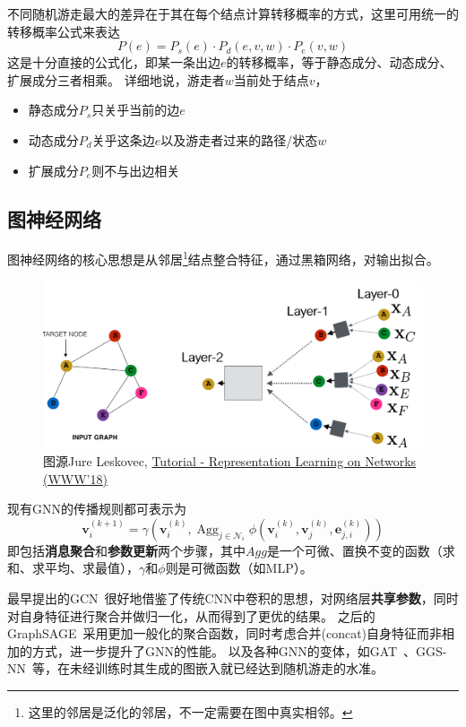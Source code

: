 \documentclass[reportComp]{thesis}
\begin{document}
不同随机游走最大的差异在于其在每个结点计算转移概率的方式\cite{yang:knightking_sosp_2019}，这里可用统一的转移概率公式来表达%
\[P(e)=P_s(e)\cdot P_d(e,v,w)\cdot P_e(v,w)\]
这是十分直接的公式化，即某一条出边$e$的转移概率，等于静态成分、动态成分、扩展成分三者相乘。
详细地说，游走者$w$当前处于结点$v$，
\begin{itemize}
	\item 静态成分$P_s$只关乎当前的边$e$
	\item 动态成分$P_d$关乎这条边$e$以及游走者过来的路径/状态$w$%
	\item 扩展成分$P_e$则不与出边相关%
\end{itemize}

\subsection{图神经网络}
图神经网络的核心思想是从邻居\footnote{这里的邻居是泛化的邻居，不一定需要在图中真实相邻。}结点整合特征，通过黑箱网络，对输出拟合。
\begin{figure}[H]
\centering
\includegraphics[width=0.8\linewidth]{fig/grl-layers.png}
\caption{图源Jure Leskovec, \href{http://snap.stanford.edu/proj/embeddings-www/}{Tutorial - Representation Learning on Networks (WWW'18)}}
\end{figure}

现有GNN的传播规则都可表示为\cite{fey:pytorch_geo_2019}
\[\mathbf{v}_i^{(k+1)}=\gamma\left(\mathbf{v}_i^{(k)},\mathop{Agg}_{j\in\mathcal{N}_i}\phi(\mathbf{v}_i^{(k)},\mathbf{v}_j^{(k)},\mathbf{e}_{j,i}^{(k)})\right)\]
即包括\textbf{消息聚合}和\textbf{参数更新}两个步骤，其中$Agg$是一个可微、置换不变的函数（求和、求平均、求最值），$\gamma$和$\phi$则是可微函数（如MLP）。

最早提出的GCN~\cite{kipf:gcn_iclr_2017}很好地借鉴了传统CNN中卷积的思想，对网络层\textbf{共享参数}，同时对自身特征进行聚合并做归一化，从而得到了更优的结果。
之后的GraphSAGE~\cite{hamilton:graphsage_neurips_2017}采用更加一般化的聚合函数，同时考虑合并(concat)自身特征而非相加的方式，进一步提升了GNN的性能。
以及各种GNN的变体，如GAT~\cite{velickovic:gat_iclr_2018}、GGS-NN~\cite{li:ggsnn_iclr_2016}等，在未经训练时其生成的图嵌入就已经达到随机游走的水准。
\end{document}
